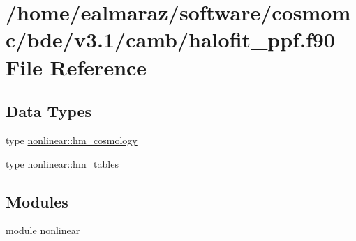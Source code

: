 \hypertarget{halofit__ppf_8f90}{}\section{/home/ealmaraz/software/cosmomc/bde/v3.1/camb/halofit\+\_\+ppf.f90 File Reference}
\label{halofit__ppf_8f90}
\subsection*{Data Types}
\begin{DoxyCompactItemize}
\item 
type \mbox{\hyperlink{structnonlinear_1_1hm__cosmology}{nonlinear\+::hm\+\_\+cosmology}}
\item 
type \mbox{\hyperlink{structnonlinear_1_1hm__tables}{nonlinear\+::hm\+\_\+tables}}
\end{DoxyCompactItemize}
\subsection*{Modules}
\begin{DoxyCompactItemize}
\item 
module \mbox{\hyperlink{namespacenonlinear}{nonlinear}}
\end{DoxyCompactItemize}
